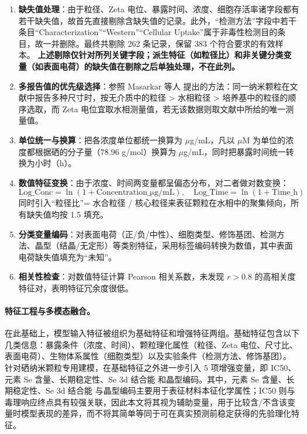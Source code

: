\begin{enumerate}
  \item \textbf{缺失值处理}：由于粒径、Zeta 电位、暴露时间、浓度、细胞存活率诸字段都有若干缺失值，故首先直接剔除含缺失值的记录。此外，“检测方法”字段中若干条目“Characterization”“Western”“Cellular Uptake”属于非毒性检测目的条目，故一并删除。最终共剔除 262 条记录，保留 383 个符合要求的有效样本。
  \textbf{上述剔除仅针对所列关键字段；派生特征（如粒径比）和非关键分类变量（如表面电荷）的缺失值在剔除之后单独处理，不在此列。}

  \item \textbf{多报告值的优先级选择}：参照 Masarkar 等人 \cite{masarkar2024} 提出的方法：同一纳米颗粒在文献中报告多种尺寸时，按无介质中的粒径 > 水相粒径 > 培养基中的粒径的顺序选取，而 Zeta 电位宜取水相测量值，若无该数据则取文献中所给的唯一测量值。

  \item \textbf{单位统一与换算}：把各浓度单位都统一换算为 $\mu$g/mL，凡以 $\mu$M 为单位的浓度都根据硒的分子量（78.96 g/mol）换算为 $\mu$g/mL，同时把暴露时间统一转换为小时（h）。

  \item \textbf{数值特征变换}：由于浓度、时间两变量都呈偏态分布，对二者做对数变换：
        \[
          \text{Log\_Conc} = \ln(1 + \text{Concentration\_μg/mL}), \quad
          \text{Log\_Time} = \ln(1 + \text{Time\_h})
        \]
        同时引入“粒径比”= 水合粒径 / 核心粒径来表征颗粒在水相中的聚集倾向，所有缺失值均按 1.5 填充。

  \item \textbf{分类变量编码}：对表面电荷（正/负/中性）、细胞类型、修饰基团、检测方法、晶型（结晶/无定形）等类别特征，采用标签编码转换为数值，其中表面电荷缺失值填充为“未知”。

  \item \textbf{相关性检查}：对数值特征计算 Pearson 相关系数，未发现 $r > 0.8$ 的高相关度特征对，表明特征冗余度很低。
\end{enumerate}

\paragraph{特征工程与多模态融合。}

在此基础上，模型输入特征被组织为基础特征和增强特征两组。基础特征包含以下几类信息：暴露条件（浓度、时间）、颗粒理化属性（粒径、Zeta 电位、尺寸比、表面电荷）、生物体系属性（细胞类型）以及实验条件（检测方法、修饰基团）。
针对硒纳米颗粒专用建模，在基础特征之外进一步引入 5 项增强变量，即 IC50、元素 Se 含量、长期稳定性、Se 3d 结合能 和晶型编码。其中，元素 Se 含量、长期稳定性、Se 3d 结合能 与晶型编码主要用于表征材料本征化学属性；IC50 则与毒理响应终点具有较强关联，因此本文将其视为辅助变量，用于比较含/不含该变量时模型表现的差异，而不将其简单等同于可在真实预测前稳定获得的先验理化特征。

